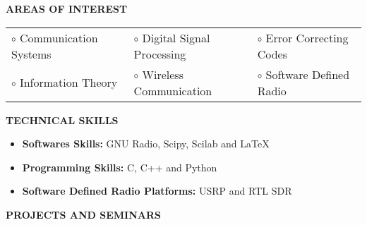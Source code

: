\documentclass[a4paper,10pt]{article}
\begin{document}
{\qquad \\ \\ \\ \\ \\ \\ \\ \\ \\ \\}

  \colorbox{titleColor}{\parbox{6.5in}{\textbf{AREAS OF INTEREST}}}

    \begin{tabular}{p{2in}p{2in}p{2in}}
      $\circ$ Communication Systems	&$\circ$ Digital Signal Processing	&$\circ$ Error Correcting Codes \\
      $\circ$ Information Theory	&$\circ$ Wireless Communication		&$\circ$ Software Defined Radio \\
    \end{tabular}

  \colorbox{titleColor}{\parbox{6.5in}{\textbf{TECHNICAL SKILLS}}}
  
    \begin{itemize}
      \setlength{\itemsep}{1pt}
      \item \textbf{{Softwares Skills:}} GNU Radio, Scipy, Scilab and \LaTeX
      \item \textbf{{Programming Skills:}} C, C++ and Python
      \item \textbf{{Software Defined Radio Platforms:}} USRP and RTL SDR
    \end{itemize}

  \colorbox{titleColor}{\parbox{6.5in}{\textbf{PROJECTS AND SEMINARS}}}
\end{document}
